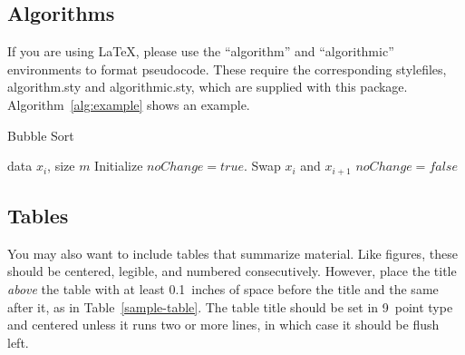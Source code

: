\documentclass{article}
\begin{document}
\subsection{Algorithms}

If you are using \LaTeX, please use the ``algorithm'' and ``algorithmic''
environments to format pseudocode. These require
the corresponding stylefiles, algorithm.sty and
algorithmic.sty, which are supplied with this package.
Algorithm~\ref{alg:example} shows an example.

\begin{algorithm}[tb]
   \caption{Bubble Sort}
   \label{alg:example}
\begin{algorithmic}
    data $x_i$, size $m$
   \REPEAT
   \STATE Initialize $noChange = true$.
   \STATE Swap $x_i$ and $x_{i+1}$
   \STATE $noChange = false$
   \ENDIF
   \ENDFOR
\end{algorithmic}
\end{algorithm}

\subsection{Tables}

You may also want to include tables that summarize material. Like
figures, these should be centered, legible, and numbered consecutively.
However, place the title \emph{above} the table with at least
0.1~inches of space before the title and the same after it, as in
Table~\ref{sample-table}. The table title should be set in 9~point
type and centered unless it runs two or more lines, in which case it
should be flush left.

\end{document}
